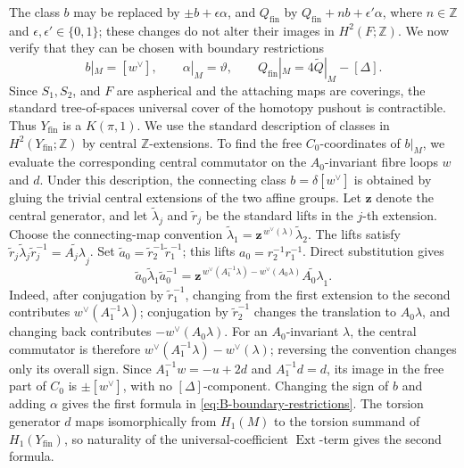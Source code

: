 The class $b$ may be replaced by $\pm b+\epsilon\alpha$, and
$Q_{\mathrm{fin}}$ by $Q_{\mathrm{fin}}+n b+\epsilon'\alpha$, where
$n\in\mathbb Z$ and $\epsilon,\epsilon'\in\{0,1\}$; these changes do not
alter their images in $H^2(F;\mathbb Z)$.  We now verify that they can be
chosen with boundary restrictions
\begin{equation}\label{eq:B-boundary-restrictions}
 b|_M=[w^\vee],\qquad
 \alpha|_M=\vartheta,\qquad
 Q_{\mathrm{fin}}|_M=4\widetilde Q|_M-[\Delta].
\end{equation}
Since $S_1,S_2$, and $F$ are aspherical and the attaching maps are
coverings, the standard tree-of-spaces universal cover of the homotopy
pushout is contractible.  Thus $Y_{\mathrm{fin}}$ is a $K(\pi,1)$.  We
use the standard description of classes in
$H^2(Y_{\mathrm{fin}};\mathbb Z)$ by central $\mathbb Z$-extensions.  To
find the free $C_0$-coordinates of $b|_M$,
we evaluate the corresponding central commutator on the $A_0$-invariant
fibre loops $w$ and $d$.  Under this description, the connecting class
$b=\delta[w^\vee]$ is obtained by gluing the trivial central extensions of
the two affine groups.  Let $\mathbf z$
denote the central generator, and let $\widetilde\lambda_j$ and
$\widetilde r_j$ be the standard lifts in the $j$-th extension.  Choose
the connecting-map convention
$\widetilde\lambda_1
=\mathbf z^{\,w^\vee(\lambda)}\widetilde\lambda_2$.
The lifts satisfy
$\widetilde r_j\widetilde\lambda_j\widetilde r_j^{-1}
=\widetilde{A_j\lambda}_j$.  Set
$\widetilde a_0=\widetilde r_2^{-1}\widetilde r_1^{-1}$; this lifts
$a_0=r_2^{-1}r_1^{-1}$.  Direct substitution gives
\[
 \widetilde a_0\widetilde\lambda_1\widetilde a_0^{-1}
 =\mathbf z^{\,w^\vee(A_1^{-1}\lambda)-w^\vee(A_0\lambda)}
   \widetilde{A_0\lambda}_1.
\]
Indeed, after conjugation by $\widetilde r_1^{-1}$, changing from the first
extension to the second contributes $w^\vee(A_1^{-1}\lambda)$;
conjugation by $\widetilde r_2^{-1}$ changes the translation to
$A_0\lambda$, and changing back contributes
$-w^\vee(A_0\lambda)$.  For an $A_0$-invariant $\lambda$, the central
commutator is therefore
$w^\vee(A_1^{-1}\lambda)-w^\vee(\lambda)$; reversing the convention changes
only its overall sign.  Since $A_1^{-1}w=-u+2d$ and $A_1^{-1}d=d$, its
image in the free part of $C_0$ is $\pm[w^\vee]$, with no
$[\Delta]$-component.  Changing the sign of $b$ and adding $\alpha$
gives the first formula in \eqref{eq:B-boundary-restrictions}.  The torsion
generator $d$ maps
isomorphically from $H_1(M)$ to the torsion summand of
$H_1(Y_{\mathrm{fin}})$, so
naturality of the universal-coefficient $\operatorname{Ext}$-term gives
the second formula.

